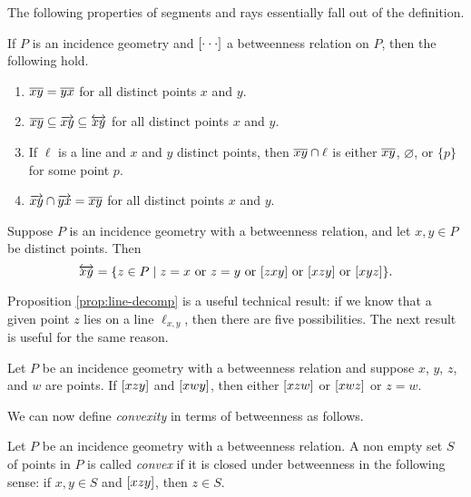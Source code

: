 The following properties of segments and rays essentially fall out of the definition.

\begin{prop}
If \(P\) is an incidence geometry and \([ \cdot \cdot \cdot ]\) a betweenness relation on \(P\), then the following hold.
\begin{enumerate}
\item \(\overline{xy} = \overline{yx}\) for all distinct points \(x\) and \(y\).
\item \(\overline{xy} \subseteq \overrightarrow{xy} \subseteq \overleftrightarrow{xy}\) for all distinct points \(x\) and \(y\).
\item If \(\ell\) is a line and \(x\) and \(y\) distinct points, then \(\overline{xy} \cap \ell\) is either \(\overline{xy}\), \(\varnothing\), or \(\{p\}\) for some point \(p\).
\item \(\overrightarrow{xy} \cap \overrightarrow{yx} = \overline{xy}\) for all distinct points \(x\) and \(y\).
\end{enumerate}
\end{prop}



\begin{prop}\label{prop:line-decomp}
Suppose \(P\) is an incidence geometry with a betweenness relation, and let \(x,y \in P\) be distinct points.
Then \[ \LINE{x}{y} = \{ z \in P \mid z = x\ \mathrm{or}\ z = y\ \mathrm{or}\ \BETWEEN{z}{x}{y}\ \mathrm{or}\ \BETWEEN{x}{z}{y}\ \mathrm{or}\ \BETWEEN{x}{y}{z} \}. \]
\end{prop}

Proposition \ref{prop:line-decomp} is a useful technical result: if we know that a given point \(z\) lies on a line \(\ell_{x,y}\), then there are five possibilities.
The next result is useful for the same reason.

\begin{prop}
Let \(P\) be an incidence geometry with a betweenness relation and suppose \(x\), \(y\), \(z\), and \(w\) are points.
If \([ x z y ]\) and \([ x w y ]\), then either \([ x z w ]\) or \([ x w z ]\) or \(z = w\).
\end{prop}

We can now define \emph{convexity} in terms of betweenness as follows.

\begin{dfn}[Convexity]
Let \(P\) be an incidence geometry with a betweenness relation.
A non empty set \(S\) of points in \(P\) is called \emph{convex} if it is closed under betweenness in the following sense: if \(x,y \in S\) and \([ x z y ]\), then \(z \in S\).
\end{dfn}




